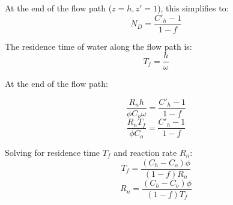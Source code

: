 \begin{tcolorbox}
{\begin{multicols}{2}
\end{multicols}

\bsk

\begin{multicols}{2} %
    
    At the end of the flow path (\(z = h, z' = 1\)), this simplifies to:
    \vspace{10mm}
    \columnbreak
    \begin{equation}
        N_D = \frac{C'_h - 1}{1-f}
    \end{equation}
    
\end{multicols}

\bsk

\begin{multicols}{2} %
    
    The residence time of water along the flow path is:
    \vspace{10mm}
    \columnbreak
    \begin{equation}
        T_f = \frac{h}{\omega}
    \end{equation}
    
\end{multicols}

\begin{multicols}{2} %
    
    At the end of the flow path:
    \vspace{10mm}


    \columnbreak
    \begin{equation}
        \frac{R_n h}{\phi C_o \omega} = \frac{C'_h - 1}{1-f}
    \end{equation}
    \begin{equation}
        \frac{R_n T_f}{\phi C_o} = \frac{C'_h - 1}{1-f}
    \end{equation}
    
\end{multicols}

\bsk

\begin{multicols}{2} %
    
    Solving for residence time \(T_f\) and reaction rate \(R_n\):
    \vspace{10mm}
    \columnbreak
    \begin{equation}
        T_f = \frac{(C_h - C_o)\phi}{(1-f)R_n}
    \end{equation}
    \begin{equation}
        R_n = \frac{(C_h - C_o)\phi}{(1-f)T_f}
    \end{equation}
    

\end{multicols}}
\end{tcolorbox}
